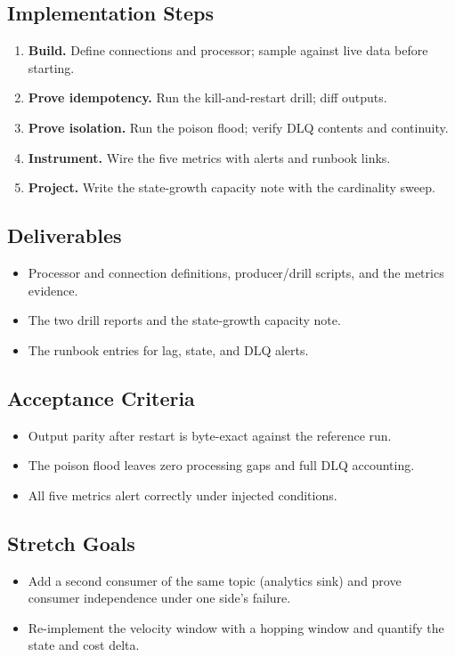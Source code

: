 \subsection*{Implementation Steps}
\begin{enumerate}
    \item \textbf{Build.} Define connections and processor; sample against live data before starting.
    \item \textbf{Prove idempotency.} Run the kill-and-restart drill; diff outputs.
    \item \textbf{Prove isolation.} Run the poison flood; verify DLQ contents and continuity.
    \item \textbf{Instrument.} Wire the five metrics with alerts and runbook links.
    \item \textbf{Project.} Write the state-growth capacity note with the cardinality sweep.
\end{enumerate}

\subsection*{Deliverables}
\begin{itemize}
    \item Processor and connection definitions, producer/drill scripts, and the metrics evidence.
    \item The two drill reports and the state-growth capacity note.
    \item The runbook entries for lag, state, and DLQ alerts.
\end{itemize}

\subsection*{Acceptance Criteria}
\begin{itemize}
    \item Output parity after restart is byte-exact against the reference run.
    \item The poison flood leaves zero processing gaps and full DLQ accounting.
    \item All five metrics alert correctly under injected conditions.
\end{itemize}

\subsection*{Stretch Goals}
\begin{itemize}
    \item Add a second consumer of the same topic (analytics sink) and prove consumer independence under one side's failure.
    \item Re-implement the velocity window with a hopping window and quantify the state and cost delta.
\end{itemize}
